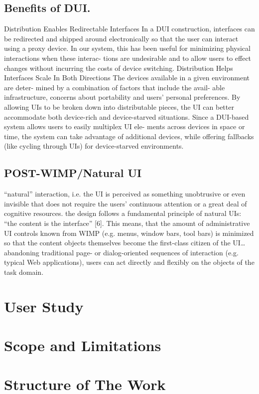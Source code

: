 \subsection{Benefits of DUI.} \cite{chen2011distributed}
Distribution Enables Redirectable Interfaces
In a DUI construction, interfaces can be redirected and shipped around electronically so that the user can interact using a proxy device. In our system, this has been useful for minimizing physical interactions when these interac- tions are undesirable and to allow users to effect changes without incurring the costs of device switching.
Distribution Helps Interfaces Scale In Both Directions
The devices available in a given environment are deter- mined by a combination
of factors that include the avail- able infrastructure, concerns about
portability and users' personal preferences. By allowing UIs to be broken down into distributable pieces, the UI can better accommodate both device-rich and device-starved situations. Since a DUI-based system allows users to easily multiplex UI ele- ments across devices in space or time, the system can take advantage of additional devices, while offering fallbacks (like cycling through UIs) for device-starved environments.\\

\subsection{POST-WIMP/Natural UI}
\cite{seifried2011lessons} “natural” interaction, i.e. the UI is perceived as
something unobtrusive or even invisible that does not require the users’
continuous attention or a great deal of cognitive resources. the design follows
a fundamental principle of natural UIs: “the content is the interface” [6]. This means, that the amount of administrative UI controls known
from WIMP (e.g. menus, window bars, tool bars) is minimized so that the content
objects themselves become the first-class citizen of the UI\ldots abandoning
traditional page- or dialog-oriented sequences of interaction (e.g. typical Web
applications), users can act directly and flexibly on the objects of the task
domain.\\

\section{User Study}

\section{Scope and Limitations}

\section{Structure of The Work}